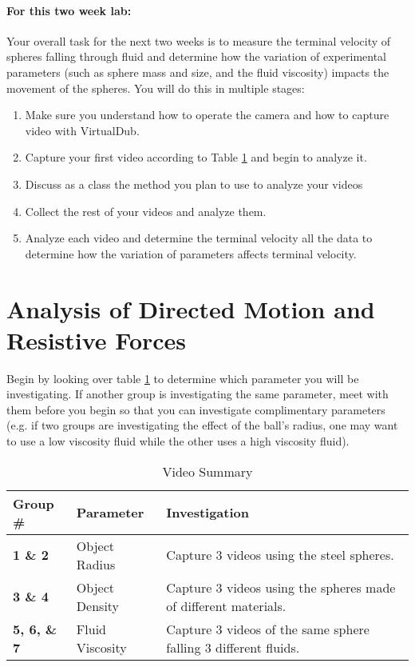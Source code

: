 \paragraph{For this two week lab:} Your overall task for the next two weeks is to measure the terminal velocity of spheres falling through fluid and determine how the variation of experimental parameters (such as sphere mass and size, and the fluid viscosity) impacts the movement of the spheres.
You will do this in multiple stages:
\begin{enumerate}
\item Make sure you understand how to operate the camera and how to capture video with VirtualDub.
\item Capture your first video according to Table \ref{tab:exp2video} and begin to analyze it.
\item Discuss as a class the method you plan to use to analyze your videos
\item Collect the rest of your videos and analyze them.
\item Analyze each video and determine the terminal velocity all the data to determine how the variation of parameters affects terminal velocity.
\end{enumerate}

\section{Analysis of Directed Motion and Resistive Forces}
Begin by looking over table \ref{tab:exp2video} to determine which parameter you will be investigating.
If another group is investigating the same parameter, meet with them before you begin so that you can investigate complimentary parameters (e.g. if two groups are investigating the effect of the ball's radius, one may want to use a low viscosity fluid while the other uses a high viscosity fluid).

\begin{table}[ht]
\centering
\begin{tabular}{|l|l|p{10cm}|}
\hline
 \textbf{Group \#} & \textbf{Parameter} & \textbf{Investigation} \\ \hline
 \textbf{1 \& 2} & Object Radius & Capture 3 videos using the steel spheres. \\ \hline
 \textbf{3 \& 4} & Object Density & Capture 3 videos using the spheres made of different materials. \\ \hline
 \textbf{5, 6, \& 7} & Fluid Viscosity & Capture 3 videos of the same sphere falling 3 different fluids. \\ \hline
\end{tabular}
\caption{Video Summary}
\label{tab:exp2video}
\end{table}

